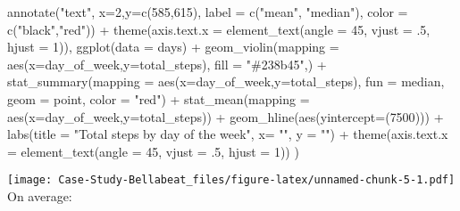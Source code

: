 \documentclass[
]{article}
\newenvironment{Shaded}{\begin{snugshade}}{\end{snugshade}}
\newcommand{\AttributeTok}[1]{\textcolor[rgb]{0.77,0.63,0.00}{#1}}
\newcommand{\DecValTok}[1]{\textcolor[rgb]{0.00,0.00,0.81}{#1}}
\newcommand{\FunctionTok}[1]{\textcolor[rgb]{0.00,0.00,0.00}{#1}}
\newcommand{\NormalTok}[1]{#1}
\newcommand{\SpecialCharTok}[1]{\textcolor[rgb]{0.00,0.00,0.00}{#1}}
\newcommand{\StringTok}[1]{\textcolor[rgb]{0.31,0.60,0.02}{#1}}
\begin{document}
\begin{Shaded}
\begin{Highlighting}[]
    \FunctionTok{annotate}\NormalTok{(}\StringTok{"text"}\NormalTok{, }\AttributeTok{x=}\DecValTok{2}\NormalTok{,}\AttributeTok{y=}\FunctionTok{c}\NormalTok{(}\DecValTok{585}\NormalTok{,}\DecValTok{615}\NormalTok{), }\AttributeTok{label =} \FunctionTok{c}\NormalTok{(}\StringTok{"mean"}\NormalTok{, }\StringTok{"median"}\NormalTok{), }\AttributeTok{color =} \FunctionTok{c}\NormalTok{(}\StringTok{"black"}\NormalTok{,}\StringTok{"red"}\NormalTok{)) }\SpecialCharTok{+}
    \FunctionTok{theme}\NormalTok{(}\AttributeTok{axis.text.x =} \FunctionTok{element\_text}\NormalTok{(}\AttributeTok{angle =} \DecValTok{45}\NormalTok{, }\AttributeTok{vjust =}\NormalTok{ .}\DecValTok{5}\NormalTok{, }\AttributeTok{hjust =} \DecValTok{1}\NormalTok{)),}
  \FunctionTok{ggplot}\NormalTok{(}\AttributeTok{data =}\NormalTok{ days) }\SpecialCharTok{+}
    \FunctionTok{geom\_violin}\NormalTok{(}\AttributeTok{mapping =} \FunctionTok{aes}\NormalTok{(}\AttributeTok{x=}\NormalTok{day\_of\_week,}\AttributeTok{y=}\NormalTok{total\_steps), }\AttributeTok{fill =} \StringTok{"\#238b45"}\NormalTok{,)  }\SpecialCharTok{+}
    \FunctionTok{stat\_summary}\NormalTok{(}\AttributeTok{mapping =} \FunctionTok{aes}\NormalTok{(}\AttributeTok{x=}\NormalTok{day\_of\_week,}\AttributeTok{y=}\NormalTok{total\_steps), }\AttributeTok{fun =}\NormalTok{ median, }\AttributeTok{geom =} \StringTok{\textquotesingle{}point\textquotesingle{}}\NormalTok{, }\AttributeTok{color =} \StringTok{"red"}\NormalTok{) }\SpecialCharTok{+}
    \FunctionTok{stat\_mean}\NormalTok{(}\AttributeTok{mapping =} \FunctionTok{aes}\NormalTok{(}\AttributeTok{x=}\NormalTok{day\_of\_week,}\AttributeTok{y=}\NormalTok{total\_steps)) }\SpecialCharTok{+}
    \FunctionTok{geom\_hline}\NormalTok{(}\FunctionTok{aes}\NormalTok{(}\AttributeTok{yintercept=}\NormalTok{(}\DecValTok{7500}\NormalTok{))) }\SpecialCharTok{+}
    \FunctionTok{labs}\NormalTok{(}\AttributeTok{title =} \StringTok{"Total steps by day of the week"}\NormalTok{, }\AttributeTok{x=} \StringTok{""}\NormalTok{, }\AttributeTok{y =} \StringTok{""}\NormalTok{) }\SpecialCharTok{+}
    \FunctionTok{theme}\NormalTok{(}\AttributeTok{axis.text.x =} \FunctionTok{element\_text}\NormalTok{(}\AttributeTok{angle =} \DecValTok{45}\NormalTok{, }\AttributeTok{vjust =}\NormalTok{ .}\DecValTok{5}\NormalTok{, }\AttributeTok{hjust =} \DecValTok{1}\NormalTok{))}
\NormalTok{    )}
\end{Highlighting}
\end{Shaded}

\texttt{[image: Case-Study-Bellabeat\_files/figure-latex/unnamed-chunk-5-1.pdf]}
On average:
\end{document}
